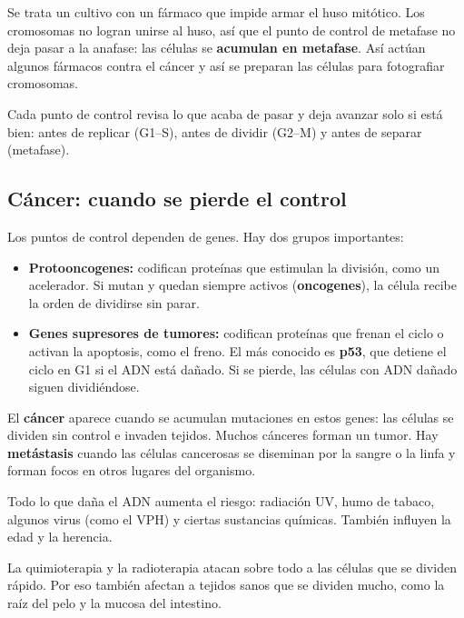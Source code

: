 \begin{ejemplo} Se trata un cultivo con un fármaco que impide armar el huso mitótico. Los cromosomas no logran unirse al huso, así que el punto de control de metafase no deja pasar a la anafase: las células se \textbf{acumulan en metafase}. Así actúan algunos fármacos contra el cáncer y así se preparan las células para fotografiar cromosomas.\end{ejemplo}
 
\begin{clave}[{Recuerda}] Cada punto de control revisa lo que acaba de pasar y deja avanzar solo si está bien: antes de replicar (G1--S), antes de dividir (G2--M) y antes de separar (metafase).\end{clave}
\subsection{Cáncer: cuando se pierde el control}
Los puntos de control dependen de genes. Hay dos grupos importantes:

 
\begin{itemize}
  \item \textbf{Protooncogenes:} codifican proteínas que estimulan la división, como un acelerador. Si mutan y quedan siempre activos (\textbf{oncogenes}), la célula recibe la orden de dividirse sin parar.
  \item \textbf{Genes supresores de tumores:} codifican proteínas que frenan el ciclo o activan la apoptosis, como el freno. El más conocido es \textbf{p53}, que detiene el ciclo en G1 si el ADN está dañado. Si se pierde, las células con ADN dañado siguen dividiéndose.
\end{itemize}
 

El \textbf{cáncer} aparece cuando se acumulan mutaciones en estos genes: las células se dividen sin control e invaden tejidos. Muchos cánceres forman un tumor. Hay \textbf{metástasis} cuando las células cancerosas se diseminan por la sangre o la linfa y forman focos en otros lugares del organismo.

  
\begin{clave} Todo lo que daña el ADN aumenta el riesgo: radiación UV, humo de tabaco, algunos virus (como el VPH) y ciertas sustancias químicas. También influyen la edad y la herencia.\end{clave}
 
\begin{clave}[{Tratamientos}] La quimioterapia y la radioterapia atacan sobre todo a las células que se dividen rápido. Por eso también afectan a tejidos sanos que se dividen mucho, como la raíz del pelo y la mucosa del intestino.\end{clave}
